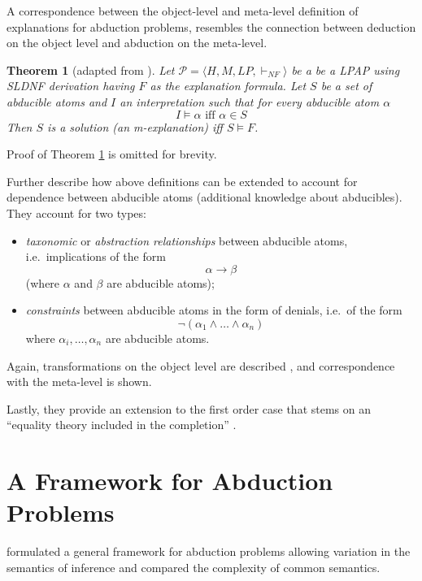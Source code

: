\documentclass[a4paper]{article}
\newcommand{\problem}{\ensuremath{\mathscr{P}}}
\newcommand{\entails}{\models}
\newtheorem{theorem}{Theorem}
\begin{document}
A correspondence between the object-level and meta-level definition of explanations for abduction problems, resembles the connection between deduction on the object level and abduction on the meta-level.
\begin{theorem}[adapted from {\cite[Theorem 2, p.~671]{DBLP:journals/logcom/ConsoleDT91}}]\label{thm:abdded}
Let $\problem = \langle H, M, LP, \vdash_{NF} \rangle$ be a  be a LPAP using SLDNF derivation having $F$ as the explanation formula. Let $S$ be a set of abducible atoms and $I$ an interpretation such that for every abducible atom $\alpha$ $$I \entails \alpha \text{  iff  } \alpha \in S$$ Then $S$ is a solution (an m-explanation) iff $S \entails F$.
\end{theorem}
Proof of Theorem \ref{thm:abdded} is omitted for brevity.

Further \citet{DBLP:journals/logcom/ConsoleDT91} describe how above definitions can be extended to account for dependence between abducible atoms (additional knowledge about abducibles). They account for two types:
\begin{itemize}
\item \emph{taxonomic} or \emph{abstraction relationships} between abducible atoms, i.e.~implications of the form $$\alpha \to \beta$$ (where $\alpha$ and $\beta$ are abducible atoms);
\item \emph{constraints} between abducible atoms in the form of denials, i.e.~of the form $$\neg(\alpha_1 \wedge \ldots \wedge \alpha_n)$$ where $\alpha_i, \ldots, \alpha_n$ are abducible atoms.
\end{itemize}
Again, transformations on the object level are described \cite[Section 4.1]{DBLP:journals/logcom/ConsoleDT91}, and correspondence with the meta-level \cite[Section 4.2]{DBLP:journals/logcom/ConsoleDT91} is shown.

Lastly, they provide an extension to the first order case that stems on an \enquote{equality theory included in the completion} \citep[Section 5.1, p.~684]{DBLP:journals/logcom/ConsoleDT91}.

\section{A Framework for Abduction Problems}
\label{sec:fw}

\citet{DBLP:journals/tcs/EiterGL97} formulated a general framework for abduction problems allowing variation in the semantics of inference and compared the complexity of common semantics.
\end{document}
